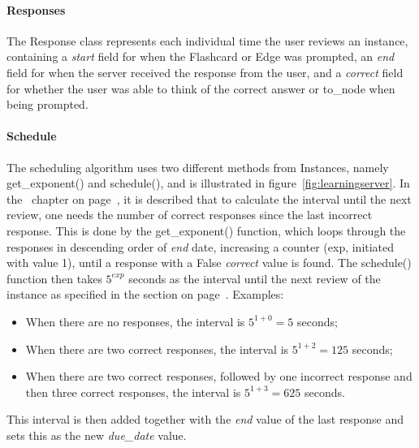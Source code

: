 \paragraph{Responses} The Response class represents each individual time the user reviews an instance, containing a \emph{start} field for when the Flashcard or Edge was prompted, an \emph{end} field for when the server received the response from the user, and a \emph{correct} field for whether the user was able to think of the correct answer or to\_node when being prompted.

\paragraph{Schedule} The scheduling algorithm uses two different methods from Instances, namely get\_exponent() and schedule(), and is illustrated in figure~\ref{fig:learningserver}. In the~ chapter on page~\pageref{ch:frameworks}, it is described that to calculate the interval until the next review, one needs the number of correct responses since the last incorrect response. This is done by the get\_exponent() function, which loops through the responses in descending order of \emph{end} date, increasing a counter (exp, initiated with value 1), until a response with a False \emph{correct} value is found. The schedule() function then takes $5^{exp}$ seconds as the interval until the next review of the instance as specified in the  section on page~\pageref{subsec:adaptivesequencing}. Examples:
%
\begin{itemize}
    \item When there are no responses, the interval is $5^{1+0}=5$ seconds;
        \item When there are two correct responses, the interval is $5^{1+2}=125$ seconds;
        \item When there are two correct responses, followed by one incorrect response and then three correct responses, the interval is $5^{1+3}=625$ seconds.
\end{itemize}
%
This interval is then added together with the \emph{end} value of the last response and sets this as the new \emph{due\_date} value.

